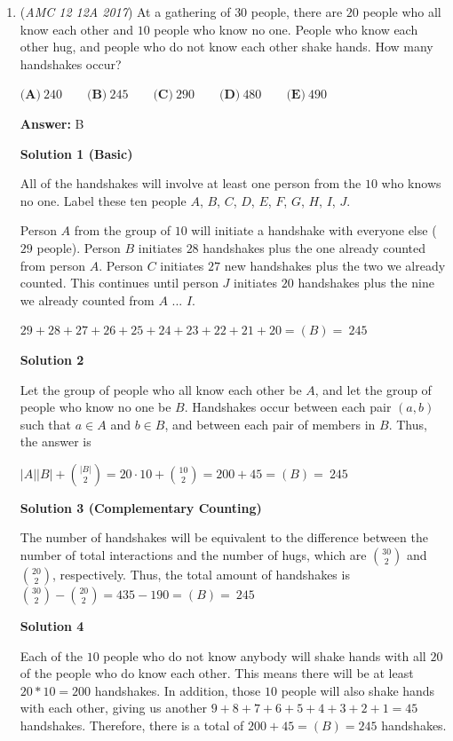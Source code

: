 \begin{enumerate}
 


 


	\item (\textit{AMC 12 12A 2017}) At a gathering of $30$ people, there are $20$ people who all know each other and $10$ people who know no one. People who know each other hug, and people who do not know each other shake hands. How many handshakes occur?


 $\textbf{(A)}\ 240\qquad\textbf{(B)}\ 245\qquad\textbf{(C)}\ 290\qquad\textbf{(D)}\ 480\qquad\textbf{(E)}\ 490$

 \textbf{Answer: }B



\textbf{Solution 1 (Basic)}

All of the handshakes will involve at least one person from the $10$ who knows no one.  Label these ten people $A$, $B$, $C$, $D$, $E$, $F$, $G$, $H$, $I$, $J$.

 Person $A$ from the group of $10$ will initiate a handshake with everyone else ($29$ people).  Person $B$ initiates $28$ handshakes plus the one already counted from person $A$.  Person $C$ initiates $27$ new handshakes plus the two we already counted.  This continues until person $J$ initiates $20$ handshakes plus the nine we already counted from $A$ ... $I$.

 $29+28+27+26+25+24+23+22+21+20 = \boxed{(B)=\ 245}$




\textbf{Solution 2}

Let the group of people who all know each other be $A$, and let the group of people who know no one be $B$. Handshakes occur between each pair $(a,b)$ such that $a\in A$ and $b\in B$, and between each pair of members in $B$. Thus, the answer is

 $|A||B|+{|B|\choose 2} = 20\cdot 10+{10\choose 2} = 200+45 = \boxed{(B)=\ 245}$




\textbf{Solution 3 (Complementary Counting)}

The number of handshakes will be equivalent to the difference between the number of total interactions and the number of hugs, which are  ${30\choose 2}$ and ${20\choose 2}$, respectively. Thus, the total amount of handshakes  is ${30\choose 2} - {20\choose 2} = 435 - 190= \boxed{(B)=\ 245}$




\textbf{Solution 4}

Each of the $10$ people who do not know anybody will shake hands with all $20$ of the people who do know each other. This means there will be at least $20 * 10 = 200$ handshakes. In addition, those $10$ people will also shake hands with each other, giving us another $9+8+7+6+5+4+3+2+1 = 45$ handshakes. Therefore, there is a total of $200+45 = \boxed{(B) = 245}$ handshakes.


\end{enumerate}
